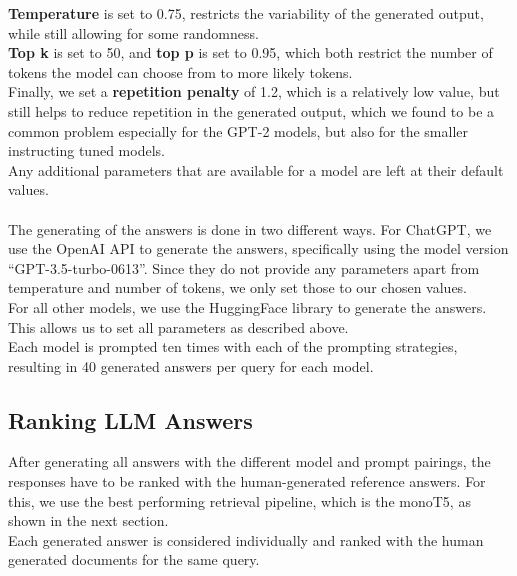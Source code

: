 \textbf{Temperature} is set to 0.75, restricts the variability of the generated output, while still allowing for some randomness.
\\
\textbf{Top k} is set to 50, and \textbf{top p} is set to 0.95, which both restrict the number of tokens the model can choose from to more likely tokens.
\\
Finally, we set a \textbf{repetition penalty} of 1.2, which is a relatively low value, but still helps to reduce repetition in the generated output, which we found to be a common problem especially for the GPT-2 models, but also for the smaller instructing tuned models.
\\
Any additional parameters that are available for a model are left at their default values.
\\
\\
The generating of the answers is done in two different ways.
For ChatGPT, we use the OpenAI API to generate the answers, specifically using the model version ``GPT-3.5-turbo-0613''.
Since they do not provide any parameters apart from temperature and number of tokens, we only set those to our chosen values.
\\
For all other models, we use the HuggingFace library to generate the answers.
This allows us to set all parameters as described above.
\\
Each model is prompted ten times with each of the prompting strategies, resulting in 40 generated answers per query for each model.


\subsection{Ranking LLM Answers}
After generating all answers with the different model and prompt pairings, the responses have to be ranked with the human-generated reference answers.
For this, we use the best performing retrieval pipeline, which is the monoT5, as shown in the next section.
\\
Each generated answer is considered individually and ranked with the human generated documents for the same query.